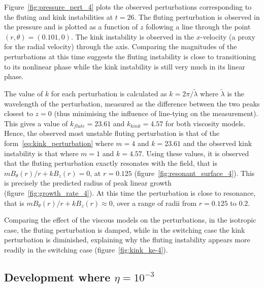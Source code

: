 Figure~\ref{fig:pressure_pert_4} plots the observed perturbations corresponding to the fluting and kink instabilities at $t=26$. The fluting perturbation is observed in the pressure and is plotted as a function of $z$ following a line through the point $(r, \theta) = (0.101, 0)$. The kink instability is observed in the $x$-velocity (a proxy for the radial velocity) through the axis. Comparing the magnitudes of the perturbations at this time suggests the fluting instability is close to transitioning to its nonlinear phase while the kink instability is still very much in its linear phase.

The value of $k$ for each perturbation is calculated as $k = 2\pi/\tilde{\lambda}$ where $\tilde{\lambda}$ is the wavelength of the perturbation, measured as the difference between the two peaks closest to $z=0$ (thus minimising the influence of line-tying on the measurement). This gives a value of $k_{flute}=23.61$ and $k_{kink}=4.57$ for both viscosity models. Hence, the observed most unstable fluting perturbation is that of the form~\eqref{eq:kink_perturbation} where $m=4$ and $k=23.61$ and the observed kink instability is that where $m=1$ and $k=4.57$. Using these values, it is observed that the fluting perturbation exactly resonates with the field, that is $m B_{\theta}(r)/r + kB_z(r) = 0$, at $r=0.125$ (figure~\ref{fig:resonant_surface_4}). This is precisely the predicted radius of peak linear growth (figure~\ref{fig:growth_rate_4}). At this time the perturbation is close to resonance, that is $m B_{\theta}(r)/r + kB_z(r) \approx 0$, over a range of radii from $r=0.125$ to $0.2$.

Comparing the effect of the viscous models on the perturbations, in the isotropic case, the fluting perturbation is damped, while in the switching case the kink perturbation is diminished, explaining why the fluting instability appears more readily in the switching case (figure~\ref{fig:kink_ke-4}).

\subsection{Development where $\eta=10^{-3}$}

